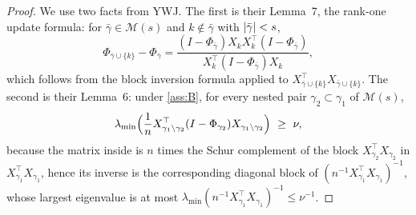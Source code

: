 \begin{proof}
    We use two facts from YWJ. The first is their Lemma~7, the rank-one
    update formula: for $\bar\gamma\in\mathscr{M}(s)$ and
    $k\notin\bar\gamma$ with $\lvert\bar\gamma\rvert<s$,
    \begin{equation}
        \label{eq:rankone}
        \Phi_{\bar\gamma\cup\{k\}}-\Phi_{\bar\gamma}
        =\frac{(I-\Phi_{\bar\gamma})X_kX_k^{\top}
            (I-\Phi_{\bar\gamma})}
        {X_k^{\top}(I-\Phi_{\bar\gamma})X_k},
    \end{equation}
    which follows from the block inversion formula applied to
    $X_{\bar\gamma\cup\{k\}}^{\top}X_{\bar\gamma\cup\{k\}}$. The second
    is their Lemma~6: under \cref{ass:B}, for every nested pair
    $\gamma_2\subset\gamma_1$ of $\mathscr{M}(s)$,
    \begin{equation}
        \label{eq:underfit}
        \lambda_{\min}\Bigl(\frac1n
        X_{\gamma_1\setminus\gamma_2}^{\top}
        (I-\Phi_{\gamma_2})X_{\gamma_1\setminus\gamma_2}\Bigr)
        \ \geq\ \nu ,
    \end{equation}
    because the matrix inside is $n$ times the Schur complement of the
    block $X_{\gamma_2}^{\top}X_{\gamma_2}$ in
    $X_{\gamma_1}^{\top}X_{\gamma_1}$, hence its inverse is the
    corresponding diagonal block of
    $(n^{-1}X_{\gamma_1}^{\top}X_{\gamma_1})^{-1}$, whose largest
    eigenvalue is at most
    $\lambda_{\min}(n^{-1}X_{\gamma_1}^{\top}X_{\gamma_1})^{-1}
    \leq\nu^{-1}$.


\end{proof}
